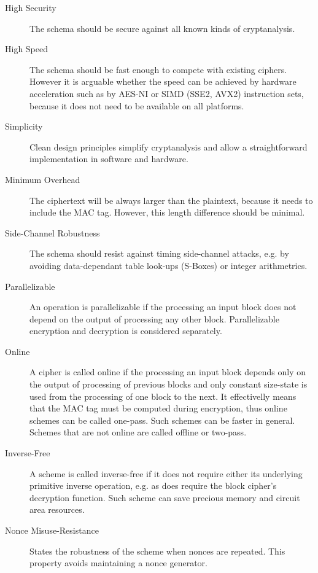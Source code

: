 \begin{description}
  \item[High Security] The schema should be secure against all known kinds of cryptanalysis.
  \item[High Speed] The schema should be fast enough to compete with existing ciphers. However it is arguable whether the speed can be achieved by hardware acceleration such as by AES-NI or SIMD (SSE2, AVX2) instruction sets, because it does not need to be available on all platforms.
  \item[Simplicity] Clean design principles simplify cryptanalysis and allow a straightforward implementation in software and hardware.
  \item[Minimum Overhead] The ciphertext will be always larger than the plaintext, because it needs to include the MAC tag. However, this length difference should be minimal.
  \item[Side-Channel Robustness] The schema should resist against timing side-channel attacks, e.g. by avoiding data-dependant table look-ups (S-Boxes) or integer arithmetrics.
  \item[Parallelizable] An operation is parallelizable if the processing an input block does not depend on the output of processing any other block. Parallelizable encryption and decryption is considered separately.
  \item[Online] A cipher is called online if the processing an input block depends only on the output of processing of previous blocks and only constant size-state is used from the processing of one block to the next. It effectivelly means that the MAC tag must be computed during encryption, thus online schemes can be called one-pass. Such schemes can be faster in general. Schemes that are not online are called offline or two-pass.
  \item[Inverse-Free] A scheme is called inverse-free if it does not require either its underlying primitive inverse operation, e.g. as does require the block cipher's decryption function. Such scheme can save precious memory and circuit area resources.
  \item[Nonce Misuse-Resistance] States the robustness of the scheme when nonces are repeated. This property avoids maintaining a nonce generator.
\end{description}
